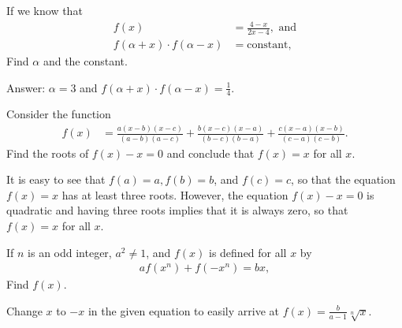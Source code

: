 \begin{tcolorbox}
\begin{question}
If we know that
\begin{align*}
    f(x) &= \frac{4-x}{2x-4}, \text{ and}\\
    f(\alpha+x) \cdot f(\alpha-x) &= \text{constant},
\end{align*}
Find $\alpha$ and the constant.
\end{question}
\end{tcolorbox}

\begin{solution}[name=Solution by Parviz Shahriari]
Answer: $\alpha=3$ and $f(\alpha+x) \cdot f(\alpha-x) = \frac{1}{4}$.
\end{solution}



\begin{tcolorbox}
\begin{question}
Consider the function
\begin{align*}
    f(x) &= \frac{a(x-b)(x-c)}{(a-b)(a-c)} + \frac{b(x-c)(x-a)}{(b-c)(b-a)} + \frac{c(x-a)(x-b)}{(c-a)(c-b)}.
\end{align*}
Find the roots of $f(x)-x=0$ and conclude that $f(x)=x$ for all $x$.
\end{question}
\end{tcolorbox}

\begin{solution}[name=Solution by Parviz Shahriari]
It is easy to see that $f(a)=a, f(b)=b$, and $f(c)=c$, so that the equation $f(x)=x$ has at least three roots. However, the equation $f(x)-x=0$ is quadratic and having three roots implies that it is always zero, so that $f(x)=x$ for all $x$.
\end{solution}


\begin{tcolorbox}
\begin{question}
If $n$ is an odd integer, $a^2 \neq 1$, and $f(x)$ is defined for all $x$ by
\begin{align*}
    af(x^n) + f(-x^n) = bx,
\end{align*}
Find $f(x)$.
\end{question}
\end{tcolorbox}

\begin{solution}[name=Solution by Parviz Shahriari]
Change $x$ to $-x$ in the given equation to easily arrive at $f(x)=\frac{b}{a-1}\sqrt[n]{x}$.
\end{solution}



